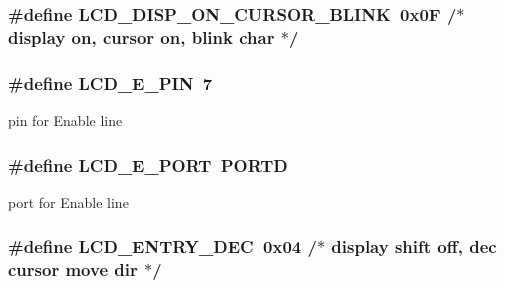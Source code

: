 \subsubsection[{\texorpdfstring{L\+C\+D\+\_\+\+D\+I\+S\+P\+\_\+\+O\+N\+\_\+\+C\+U\+R\+S\+O\+R\+\_\+\+B\+L\+I\+NK}{LCD_DISP_ON_CURSOR_BLINK}}]{\setlength{\rightskip}{0pt plus 5cm}\#define L\+C\+D\+\_\+\+D\+I\+S\+P\+\_\+\+O\+N\+\_\+\+C\+U\+R\+S\+O\+R\+\_\+\+B\+L\+I\+NK~0x0\+F   /$\ast$ display on, cursor on, blink char      $\ast$/}\hypertarget{group__pfleury__lcd_gac1984ed0db15c6991d34c184fdca5dc6}{}\label{group__pfleury__lcd_gac1984ed0db15c6991d34c184fdca5dc6}
\subsubsection[{\texorpdfstring{L\+C\+D\+\_\+\+E\+\_\+\+P\+IN}{LCD_E_PIN}}]{\setlength{\rightskip}{0pt plus 5cm}\#define L\+C\+D\+\_\+\+E\+\_\+\+P\+IN~7}\hypertarget{group__pfleury__lcd_gae644d776392a8d47899d9910c2b8feb6}{}\label{group__pfleury__lcd_gae644d776392a8d47899d9910c2b8feb6}
pin for Enable line 
\subsubsection[{\texorpdfstring{L\+C\+D\+\_\+\+E\+\_\+\+P\+O\+RT}{LCD_E_PORT}}]{\setlength{\rightskip}{0pt plus 5cm}\#define L\+C\+D\+\_\+\+E\+\_\+\+P\+O\+RT~P\+O\+R\+TD}\hypertarget{group__pfleury__lcd_gaf97f97ff3832d1289bbcb471090ea297}{}\label{group__pfleury__lcd_gaf97f97ff3832d1289bbcb471090ea297}
port for Enable line 
\subsubsection[{\texorpdfstring{L\+C\+D\+\_\+\+E\+N\+T\+R\+Y\+\_\+\+D\+EC}{LCD_ENTRY_DEC}}]{\setlength{\rightskip}{0pt plus 5cm}\#define L\+C\+D\+\_\+\+E\+N\+T\+R\+Y\+\_\+\+D\+EC~0x04   /$\ast$ display shift off, dec cursor move dir $\ast$/}\hypertarget{group__pfleury__lcd_gaad56f8e07634e85663f56888ae97089c}{}\label{group__pfleury__lcd_gaad56f8e07634e85663f56888ae97089c}
